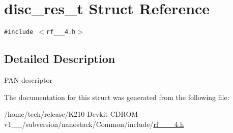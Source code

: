 \hypertarget{structdisc__res__t}{
\section{disc\_\-res\_\-t Struct Reference}
\label{structdisc__res__t}
}
{\tt \#include $<$rf\_\_\_\-4.h$>$}



\subsection{Detailed Description}
PAN-descriptor 



The documentation for this struct was generated from the following file:\begin{CompactItemize}
\item 
/home/tech/release/K210-Devkit-CDROM-v1\_\_/subversion/nanostack/Common/include/\hyperlink{rf__802__15__4_8h}{rf\_\_\_\-4.h}\end{CompactItemize}
